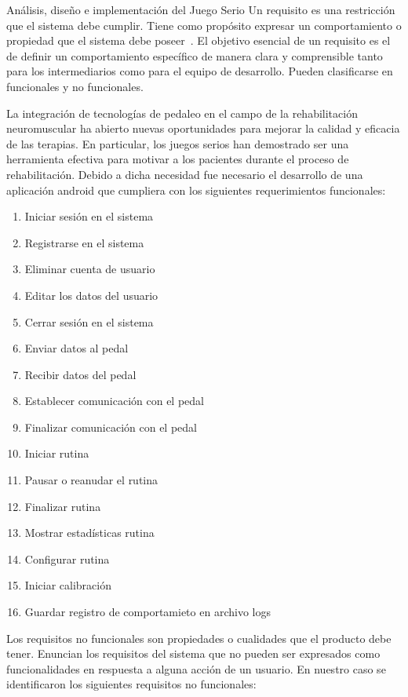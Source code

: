 \begin{thesischapter}{2} {Análisis, diseño e implementación del Juego Serio}
    Un requisito es una restricción que el sistema debe cumplir. Tiene como propósito expresar un comportamiento o propiedad que 
    el sistema debe poseer~\cite{jacobson2000uml}. El objetivo esencial de un requisito es el de definir un comportamiento específico 
    de manera clara y comprensible tanto para los intermediarios como para el equipo de desarrollo. Pueden clasificarse en funcionales 
    y no funcionales.

    La integración de tecnologías de pedaleo en el campo de la rehabilitación neuromuscular ha abierto nuevas oportunidades 
    para mejorar la calidad y eficacia de las terapias. En particular, los juegos serios han demostrado ser una herramienta 
    efectiva para motivar a los pacientes durante el proceso de rehabilitación. Debido a dicha necesidad fue necesario   
    el desarrollo de una aplicación android que cumpliera con los siguientes requerimientos funcionales:

    \begin{enumerate}
        \item Iniciar sesión en el sistema
        \item Registrarse en el sistema
        \item Eliminar cuenta de usuario
        \item Editar los datos del usuario
        \item Cerrar sesión en el sistema
        \item Enviar datos al pedal
        \item Recibir datos del pedal
        \item Establecer comunicación con el pedal
        \item Finalizar comunicación con el pedal
        \item Iniciar rutina
        \item Pausar o reanudar el rutina
        \item Finalizar rutina
        \item Mostrar estadísticas rutina
        \item Configurar rutina
        \item Iniciar calibración
        \item Guardar registro de comportamieto en archivo logs
    \end{enumerate}
    Los requisitos no funcionales son propiedades o cualidades que el producto debe tener. Enuncian los requisitos del sistema que no pueden ser expresados como funcionalidades en respuesta a alguna acción de un usuario. 
    En nuestro caso se identificaron los siguientes requisitos no funcionales:
        

\end{thesischapter}
